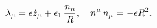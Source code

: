 \begin{equation}
\lambda_{\mu}=\epsilon \dot{z}_{\mu}+\epsilon_{1}\,{n_{\mu} \over R},
~~~ n^{\mu}\, n_{\mu}=-\epsilon R^2.
\end{equation}

